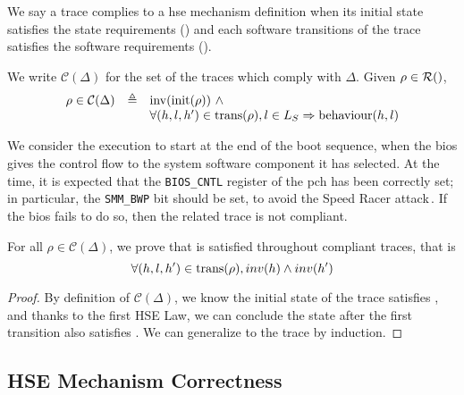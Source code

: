 We say a trace complies to a \ac{hse} mechanism definition when its initial
state satisfies the state requirements () and each software
transitions of the trace satisfies the software requirements ().
%
\begin{definition}
  We write $\mathcal{C}(\Delta)$ for the set of the traces which comply with
  $\Delta$.
  Given $\rho \in \pathesLTS{Ez}$,
  \[
    \begin{array}{lcl}
      \rho \in \mathcal{C}(\Delta)
      & \triangleq
      & \mathrm{inv}(\mathrm{init}(\rho))\ \wedge \\
      &
      & \forall (h,l,h') \in \mathrm{trans}(\rho), l \in L_S \Rightarrow \mathrm{behaviour}(h, l)
    \end{array}
  \]
\end{definition}

\begin{example}
  We consider the execution to start at the end of the boot sequence, when the
  \ac{bios} gives the control flow to the system software component it has
  selected.
  At the time, it is expected that the \texttt{BIOS\_CNTL} register of the
  \ac{pch} has been correctly set; in particular, the \texttt{SMM\_BWP} bit
  should be set, to avoid the Speed Racer
  attack\,\cite{kallenberg2015racecondition}.
  If the \ac{bios} fails to do so, then the related trace is not compliant.
\end{example}

\begin{lemma}
  For all $\rho \in \mathcal{C}(\Delta)$, we prove that  is satisfied
  throughout compliant traces, that is
  \[
    \forall (h, l, h') \in \mathrm{trans}(\rho), inv(h) \wedge inv(h')
  \]

  \begin{proof}
    \label{lemma:speccert:invariant}
    By definition of $\mathcal{C}(\Delta)$, we know the initial state of the
    trace satisfies , and thanks to the first HSE Law, we can conclude
    the state after the first transition also satisfies .
    We can generalize to the trace by induction.
  \end{proof}
\end{lemma}

\subsection{HSE Mechanism Correctness}
\label{subsec:speccert:correct}

